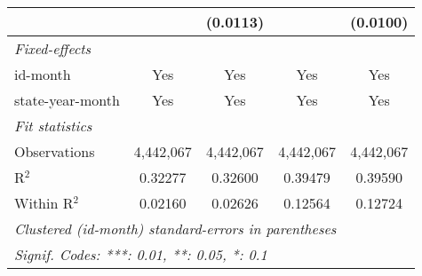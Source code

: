 \begin{tabular}{lcccc}
  &    & (0.0113) &    & (0.0100)\\
\midrule \emph{Fixed-effects} &   &   &   &  \\
id-month & Yes & Yes & Yes & Yes\\
state-year-month & Yes & Yes & Yes & Yes\\
\midrule \emph{Fit statistics} &   &   &   &  \\
Observations & 4,442,067 & 4,442,067 & 4,442,067 & 4,442,067\\
R$^2$ & 0.32277 & 0.32600 & 0.39479 & 0.39590\\
Within R$^2$ & 0.02160 & 0.02626 & 0.12564 & 0.12724\\
\midrule\midrule\multicolumn{5}{l}{\emph{Clustered (id-month) standard-errors in parentheses}}\\
\multicolumn{5}{l}{\emph{Signif. Codes: ***: 0.01, **: 0.05, *: 0.1}}\\
\end{tabular}



